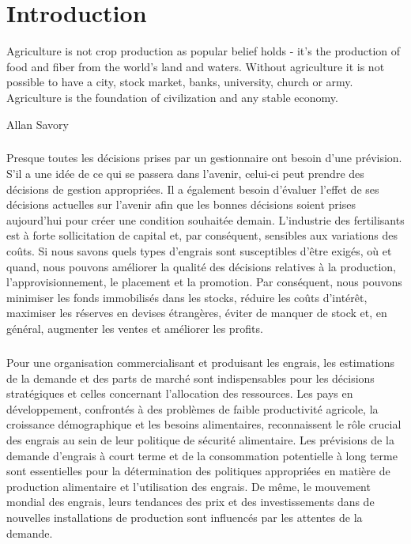 \chapter*{Introduction}
\epigraph{Agriculture is not crop production as popular belief holds - it's the production of food and fiber from the world's land and waters. Without agriculture it is not possible to have a city, stock market, banks, university, church or army. Agriculture is the foundation of civilization and any stable economy.}{Allan Savory}

\paragraph{}
Presque toutes les décisions prises par un gestionnaire ont besoin d'une prévision. S'il a une idée de ce qui se passera dans l'avenir, celui-ci peut prendre des décisions de gestion appropriées. Il a également besoin d'évaluer l'effet de ses décisions actuelles sur l'avenir afin que les bonnes décisions soient prises aujourd'hui pour créer une condition souhaitée demain. L’industrie des fertilisants est à forte sollicitation de capital et, par conséquent, sensibles aux variations des coûts. Si nous savons quels types d'engrais sont susceptibles d'être exigés, où et quand, nous pouvons améliorer la qualité des décisions relatives à la production, l'approvisionnement, le placement et la promotion. Par conséquent, nous pouvons minimiser les fonds immobilisés dans les stocks, réduire les coûts d'intérêt, maximiser les réserves en devises étrangères, éviter de manquer de stock et, en général, augmenter les ventes et améliorer les profits.
\paragraph{}
Pour une organisation commercialisant et produisant les engrais, les estimations de la demande et des parts de marché sont indispensables pour les décisions stratégiques et celles concernant l'allocation des ressources. Les pays en développement, confrontés à des problèmes de faible productivité agricole, la croissance démographique et les besoins alimentaires, reconnaissent le rôle crucial des engrais au sein de leur politique de sécurité alimentaire. Les prévisions de la demande d'engrais à court terme et de la consommation potentielle à long terme sont essentielles pour la détermination des politiques appropriées en matière de production alimentaire et l'utilisation des engrais. De même, le mouvement mondial des engrais, leurs tendances des prix et des investissements dans de nouvelles installations de production sont influencés par les attentes de la demande.
